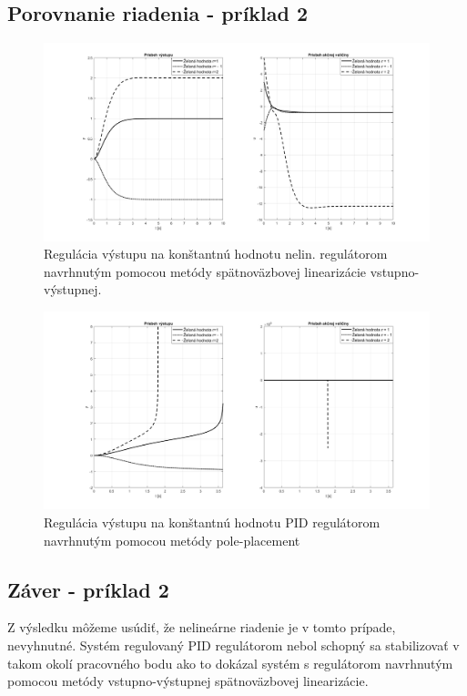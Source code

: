 \documentclass[../main.tex]{subfiles}
\begin{document}
	\subsection*{Porovnanie riadenia - príklad 2}	
	\begin{figure}[h!]
		\centering
		\includegraphics[width=\linewidth]{pr2vys}
		\caption{Regulácia výstupu na konštantnú hodnotu nelin. regulátorom navrhnutým pomocou metódy spätnoväzbovej linearizácie vstupno-výstupnej.}
		\label{fig:svlvvPr2Vys}
	\end{figure}
	\begin{figure}[h!]
		\centering
		\includegraphics[width=\linewidth]{pr2vysPID}
		\caption{Regulácia výstupu na konštantnú hodnotu PID regulátorom navrhnutým pomocou metódy pole-placement}
		\label{fig:svlvvPr2VysPID}
	\end{figure}
	\newpage
	\subsection*{Záver - príklad 2}
	Z výsledku môžeme usúdiť, že nelineárne riadenie je v tomto prípade, nevyhnutné. Systém regulovaný PID regulátorom nebol schopný sa stabilizovať v takom okolí pracovného bodu ako to dokázal systém s regulátorom navrhnutým pomocou metódy vstupno-výstupnej spätnoväzbovej linearizácie. 
\end{document}
